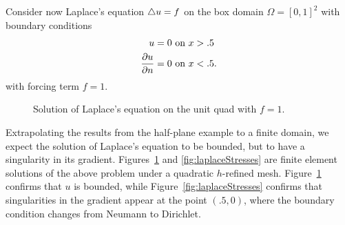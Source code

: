 Consider now Laplace's equation $\del u = f$ on the box domain $\Omega = [0,1]^2$ with boundary conditions
\begin{align*}
u &= 0 \text{ on } x > .5\\
\pd{u}{n} &= 0 \text{ on } x < .5.
\end{align*}
with forcing term $f=1$.  
\begin{figure}[!h]
\centering
{}
\caption{Solution of Laplace's equation on the unit quad with $f=1$.}
\label{fig:laplace}
\end{figure}
Extrapolating the results from the half-plane example to a finite domain, we expect the solution of Laplace's equation to be bounded, but to have a singularity in its gradient.  Figures~\ref{fig:laplace} and \ref{fig:laplaceStresses} are finite element solutions of the above problem under a quadratic $h$-refined mesh.  Figure~\ref{fig:laplace} confirms that $u$ is bounded, while Figure~\ref{fig:laplaceStresses} confirms that singularities in the gradient appear at the point $(.5,0)$, where the boundary condition changes from Neumann to Dirichlet.  

